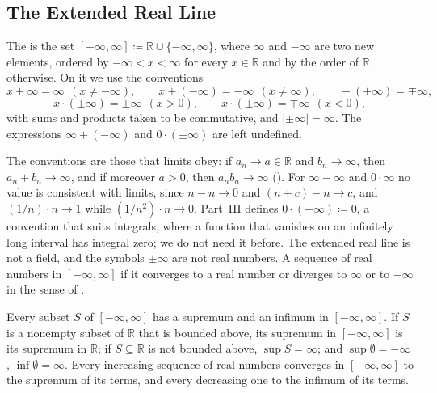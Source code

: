 \subsection{The Extended Real Line}

\begin{definition}
\label{def:extended-reals}
The  is the set $[-\infty,\infty]\coloneqq\mathbb R\cup\{-\infty,\infty\}$, where $\infty$ and $-\infty$ are two new elements, ordered by $-\infty<x<\infty$ for every $x\in\mathbb R$ and by the order of $\mathbb R$ otherwise. On it we use the conventions
\[
x+\infty=\infty\ \ (x\ne-\infty),\qquad x+(-\infty)=-\infty\ \ (x\ne\infty),\qquad-(\pm\infty)=\mp\infty,
\]
\[
x\cdot(\pm\infty)=\pm\infty\ \ (x>0),\qquad x\cdot(\pm\infty)=\mp\infty\ \ (x<0),
\]
with sums and products taken to be commutative, and $|\pm\infty|=\infty$. The expressions $\infty+(-\infty)$ and $0\cdot(\pm\infty)$ are left undefined.
\end{definition}

The conventions are those that limits obey: if $a_n\to a\in\mathbb R$ and $b_n\to\infty$, then $a_n+b_n\to\infty$, and if moreover $a>0$, then $a_nb_n\to\infty$ (). For $\infty-\infty$ and $0\cdot\infty$ no value is consistent with limits, since $n-n\to0$ and $(n+c)-n\to c$, and $(1/n)\cdot n\to1$ while $(1/n^2)\cdot n\to0$. Part~III defines $0\cdot(\pm\infty)\coloneqq0$, a convention that suits integrals, where a function that vanishes on an infinitely long interval has integral zero; we do not need it before. The extended real line is not a field, and the symbols $\pm\infty$ are not real numbers. A sequence of real numbers  in $[-\infty,\infty]$ if it converges to a real number or diverges to $\infty$ or to $-\infty$ in the sense of .

\begin{proposition}
\label{prop:extended-sup}
Every subset $S$ of $[-\infty,\infty]$ has a supremum and an infimum in $[-\infty,\infty]$. If $S$ is a nonempty subset of $\mathbb R$ that is bounded above, its supremum in $[-\infty,\infty]$ is its supremum in $\mathbb R$; if $S\subseteq\mathbb R$ is not bounded above, $\sup S=\infty$; and $\sup\emptyset=-\infty$, $\inf\emptyset=\infty$. Every increasing sequence of real numbers converges in $[-\infty,\infty]$ to the supremum of its terms, and every decreasing one to the infimum of its terms.
\end{proposition}

